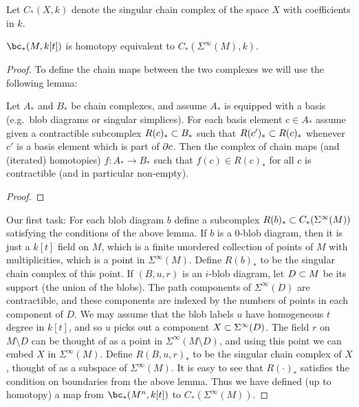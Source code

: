 \documentclass[11pt,leqno]{amsart}
\begin{document}
Let $C_*(X, k)$ denote the singular chain complex of the space $X$ with coefficients in $k$.

\begin{prop} \label{sympowerprop}
$\bc_*(M, k[t])$ is homotopy equivalent to $C_*(\Sigma^\infty(M), k)$.
\end{prop}

\begin{proof}
To define the chain maps between the two complexes we will use the following lemma:

\begin{lemma}
Let $A_*$ and $B_*$ be chain complexes, and assume $A_*$ is equipped with
a basis (e.g.\ blob diagrams or singular simplices).
For each basis element $c \in A_*$ assume given a contractible subcomplex $R(c)_* \subset B_*$
such that $R(c')_* \subset R(c)_*$ whenever $c'$ is a basis element which is part of $\partial c$.
Then the complex of chain maps (and (iterated) homotopies) $f:A_*\to B_*$ such that
$f(c) \in R(c)_*$ for all $c$ is contractible (and in particular non-empty).
\end{lemma}

\begin{proof}
\end{proof}

Our first task: For each blob diagram $b$ define a subcomplex $R(b)_* \subset C_*(\Sigma^\infty(M))$
satisfying the conditions of the above lemma.
If $b$ is a 0-blob diagram, then it is just a $k[t]$ field on $M$, which is a 
finite unordered collection of points of $M$ with multiplicities, which is
a point in $\Sigma^\infty(M)$.
Define $R(b)_*$ to be the singular chain complex of this point.
If $(B, u, r)$ is an $i$-blob diagram, let $D\subset M$ be its support (the union of the blobs).
The path components of $\Sigma^\infty(D)$ are contractible, and these components are indexed 
by the numbers of points in each component of $D$.
We may assume that the blob labels $u$ have homogeneous $t$ degree in $k[t]$, and so
$u$ picks out a component $X \subset \Sigma^\infty(D)$.
The field $r$ on $M\setminus D$ can be thought of as a point in $\Sigma^\infty(M\setminus D)$,
and using this point we can embed $X$ in $\Sigma^\infty(M)$.
Define $R(B, u, r)_*$ to be the singular chain complex of $X$, thought of as a 
subspace of $\Sigma^\infty(M)$.
It is easy to see that $R(\cdot)_*$ satisfies the condition on boundaries from the above lemma.
Thus we have defined (up to homotopy) a map from 
$\bc_*(M^n, k[t])$ to $C_*(\Sigma^\infty(M))$.


\end{proof}
\end{document}

